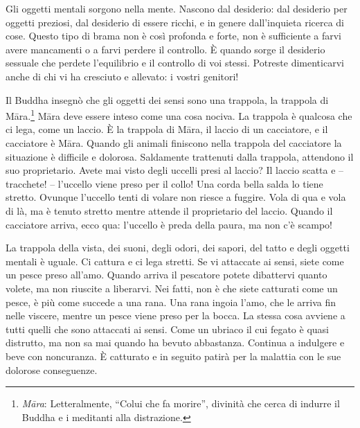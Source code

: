 Gli oggetti mentali sorgono nella mente. Nascono dal desiderio: dal
desiderio per oggetti preziosi, dal desiderio di essere ricchi, e in
genere dall'inquieta ricerca di cose. Questo tipo di brama non è così
profonda e forte, non è sufficiente a farvi avere mancamenti o a farvi
perdere il controllo. È quando sorge il desiderio sessuale che perdete
l'equilibrio e il controllo di voi stessi. Potreste dimenticarvi anche
di chi vi ha cresciuto e allevato: i vostri genitori!

Il Buddha insegnò che gli oggetti dei sensi sono una trappola, la
trappola di Māra.\footnote{\emph{Māra}: Letteralmente, ``Colui che fa morire'',
  divinità che cerca di indurre il Buddha e i meditanti alla
  distrazione.} Māra deve essere inteso come una cosa nociva. La
trappola è qualcosa che ci lega, come un laccio. È la trappola di Māra,
il laccio di un cacciatore, e il cacciatore è Māra. Quando gli animali
finiscono nella trappola del cacciatore la situazione è difficile e
dolorosa. Saldamente trattenuti dalla trappola, attendono il suo
proprietario. Avete mai visto degli uccelli presi al laccio? Il laccio
scatta e -- tracchete! -- l'uccello viene preso per il collo! Una corda
bella salda lo tiene stretto. Ovunque l'uccello tenti di volare non
riesce a fuggire. Vola di qua e vola di là, ma è tenuto stretto mentre
attende il proprietario del laccio. Quando il cacciatore arriva, ecco
qua: l'uccello è preda della paura, ma non c'è scampo!

La trappola della vista, dei suoni, degli odori, dei sapori, del tatto e
degli oggetti mentali è uguale. Ci cattura e ci lega stretti. Se vi
attaccate ai sensi, siete come un pesce preso all'amo. Quando arriva il
pescatore potete dibattervi quanto volete, ma non riuscite a liberarvi.
Nei fatti, non è che siete catturati come un pesce, è più come succede a
una rana. Una rana ingoia l'amo, che le arriva fin nelle viscere, mentre
un pesce viene preso per la bocca. La stessa cosa avviene a tutti quelli
che sono attaccati ai sensi. Come un ubriaco il cui fegato è quasi
distrutto, ma non sa mai quando ha bevuto abbastanza. Continua a
indulgere e beve con noncuranza. È catturato e in seguito patirà per la
malattia con le sue dolorose conseguenze.

